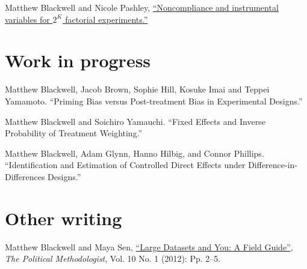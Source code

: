 \documentclass[margin,line,12pt]{res}
\begin{document}
\begin{resume}
Matthew Blackwell and Nicole Pashley, \href{https://mattblackwell.org/files/papers/factorial-iv.pdf}{``Noncompliance and instrumental variables for $2^K$ factorial experiments.''} 



\section{\sc Work in progress}


Matthew Blackwell, Jacob Brown, Sophie Hill, Kosuke Imai and Teppei Yamamoto. ``Priming Bias versus Post-treatment Bias in Experimental Designs.'' 


Matthew Blackwell and Soichiro Yamauchi. ``Fixed Effects and Inverse Probability of Treatment Weighting.''

Matthew Blackwell, Adam Glynn, Hanno Hilbig, and Connor Phillips. ``Identification and Estimation of Controlled Direct Effects under Difference-in-Differences Designs.''


\section{\sc Other writing}

Matthew Blackwell and Maya Sen, 
\href{http://www.mattblackwell.org/files/papers/bigdata.pdf}{``Large
  Datasets and You: A Field Guide''}, \emph{The Political
  Methodologist}, Vol. 10 No. 1 (2012): Pp. 2--5.


\end{resume}
\end{document}
